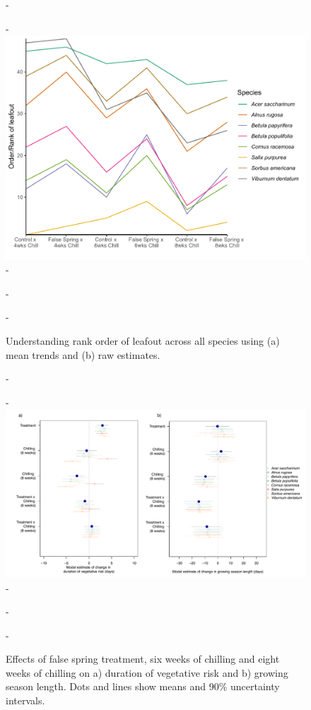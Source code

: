 \documentclass{article}\usepackage[]{graphicx}\usepackage[]{color}
\begin{document}
  {\begin{figure} [H]
  -\begin{center}
  -\includegraphics[width=12cm]{..//analyses/figures/leafoutorder_byrank.pdf} 
  -\caption{Understanding rank order of leafout across all species using (a) mean trends and (b) raw estimates. }\label{fig:rank}
  -\end{center}
  -\end{figure}}
  
  {\begin{figure} [H]
  -\begin{center}
  -\includegraphics[width=18cm]{..//analyses/figures/mu_phen90.pdf} 
  -\caption{Effects of false spring treatment, six weeks of chilling and eight weeks of chilling on a) duration of vegetative risk and b) growing season length. Dots and lines show means and 90\% uncertainty intervals.}\label{fig:muphen}
  -\end{center}
  -\end{figure}}
  
\end{document}
